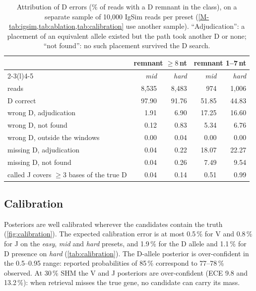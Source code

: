 \documentclass[11pt,a4paper]{article}
\begin{document}
\begin{table}[tbp]
\centering
\caption{Attribution of D errors (\% of reads with a D remnant in the class),
on a separate sample of 10,000 IgSim reads per preset (\cref{M-tab:igsim,tab:ablation,tab:calibration}
use another sample). ``Adjudication'': a placement of an
equivalent allele existed but the path took another D or none; ``not
found'': no such placement survived the D search.}
\label{tab:derrors}
\footnotesize
\begin{tabular}{@{}l rr rr@{}}
\toprule
 & \multicolumn{2}{c}{remnant $\ge 8$\,nt} & \multicolumn{2}{c}{remnant 1--7\,nt} \\
\cmidrule(lr){2-3}\cmidrule(l){4-5}
 & \emph{mid} & \emph{hard} & \emph{mid} & \emph{hard} \\
\midrule
reads                                      & 8,535 & 8,483 & 974 & 1,006 \\
D correct                                  & 97.90 & 91.76 & 51.85 & 44.83 \\
wrong D, adjudication                      & 1.91 & 6.90 & 17.25 & 16.60 \\
wrong D, not found                         & 0.12 & 0.83 & 5.34 & 6.76 \\
wrong D, outside the windows               & 0.00 & 0.04 & 0.00 & 0.00 \\
missing D, adjudication                    & 0.04 & 0.22 & 18.07 & 22.27 \\
missing D, not found                       & 0.04 & 0.26 & 7.49 & 9.54 \\
called J covers $\ge 3$ bases of the true D & 0.04 & 0.14 & 0.51 & 0.99 \\
\bottomrule
\end{tabular}
\end{table}

\subsection{Calibration}
\label{sec:calibration}

Posteriors are well calibrated wherever the candidates contain the truth
(\cref{fig:calibration}). The expected calibration error is at most 0.5\,\%
for V and 0.8\,\% for J on the \emph{easy}, \emph{mid} and \emph{hard}
presets, and 1.9\,\% for the D allele and
1.1\,\% for D presence on \emph{hard} (\cref{tab:calibration}). The D-allele
posterior is over-confident in the 0.5--0.95 range: reported probabilities
of 85\,\% correspond to 77--78\,\% observed. At 30\,\% SHM the V and J
posteriors are over-confident (ECE 9.8 and 13.2\,\%): when retrieval misses
the true gene, no candidate can carry its mass.
\end{document}
